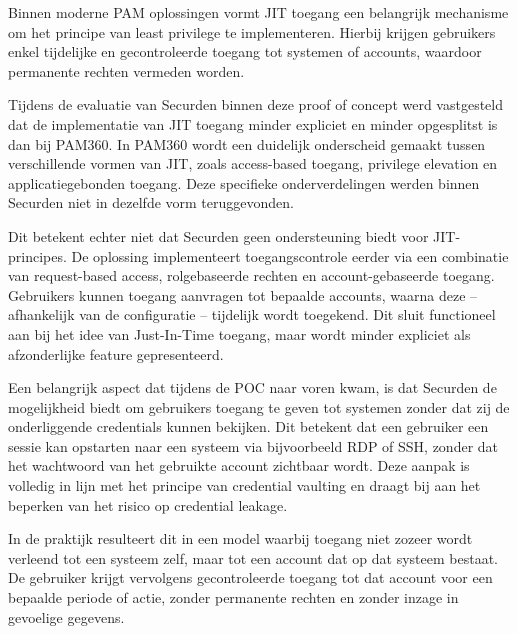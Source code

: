 Binnen moderne PAM oplossingen vormt JIT toegang een belangrijk mechanisme om het principe van least privilege te implementeren. Hierbij krijgen gebruikers enkel tijdelijke en gecontroleerde toegang tot systemen of accounts, waardoor permanente rechten vermeden worden.

Tijdens de evaluatie van Securden binnen deze proof of concept werd vastgesteld dat de implementatie van JIT toegang minder expliciet en minder opgesplitst is dan bij PAM360. In PAM360 wordt een duidelijk onderscheid gemaakt tussen verschillende vormen van JIT, zoals access-based toegang, privilege elevation en applicatiegebonden toegang. Deze specifieke onderverdelingen werden binnen Securden niet in dezelfde vorm teruggevonden.

Dit betekent echter niet dat Securden geen ondersteuning biedt voor JIT-principes. De oplossing implementeert toegangscontrole eerder via een combinatie van request-based access, rolgebaseerde rechten en account-gebaseerde toegang. Gebruikers kunnen toegang aanvragen tot bepaalde accounts, waarna deze – afhankelijk van de configuratie – tijdelijk wordt toegekend. Dit sluit functioneel aan bij het idee van Just-In-Time toegang, maar wordt minder expliciet als afzonderlijke feature gepresenteerd.

Een belangrijk aspect dat tijdens de POC naar voren kwam, is dat Securden de mogelijkheid biedt om gebruikers toegang te geven tot systemen zonder dat zij de onderliggende credentials kunnen bekijken. Dit betekent dat een gebruiker een sessie kan opstarten naar een systeem via bijvoorbeeld RDP of SSH, zonder dat het wachtwoord van het gebruikte account zichtbaar wordt. Deze aanpak is volledig in lijn met het principe van credential vaulting en draagt bij aan het beperken van het risico op credential leakage.

In de praktijk resulteert dit in een model waarbij toegang niet zozeer wordt verleend tot een systeem zelf, maar tot een account dat op dat systeem bestaat. De gebruiker krijgt vervolgens gecontroleerde toegang tot dat account voor een bepaalde periode of actie, zonder permanente rechten en zonder inzage in gevoelige gegevens.

